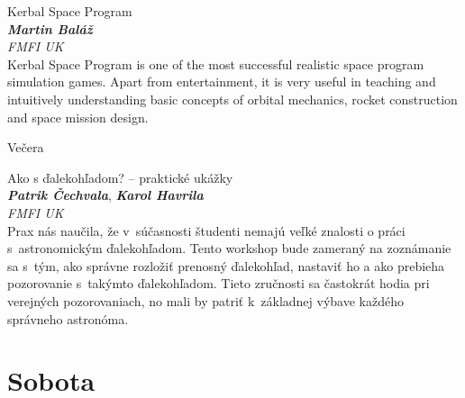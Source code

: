 \documentclass[a4paper]{report}
\begin{document}
                    \begin{tcolorbox}[
                                    colback=white,
                    colframe=black!70!white,
                                fonttitle=\Large\bfseries,
                title=18:00
            ]
                {\Large Kerbal Space Program}
                                                            \\ \textbf{\textit{Martin Baláž}}
                                                    \\ \textit{FMFI UK}                \\[2ex]Kerbal Space Program is one of the most successful realistic space program simulation games. Apart from entertainment, it is very useful in teaching and intuitively understanding basic concepts of orbital mechanics, rocket construction and space mission design.
            \end{tcolorbox}
                    \begin{tcolorbox}[
                                    colback=red!10,
                    colframe=red!50!black,
                                fonttitle=\Large\bfseries,
                title=19:00
            ]
                {\Large Večera}
                                                            \end{tcolorbox}
                    \begin{tcolorbox}[
                                    colback=blue!10,
                    colframe=black!50!blue,
                                fonttitle=\Large\bfseries,
                title=21:00
            ]
                {\Large Ako s ďalekohľadom? -- praktické ukážky}
                                                            \\ \textit{\textbf{Patrik Čechvala}}, \textit{\textbf{Karol Havrila}}                                                    \\ \textit{FMFI UK}                \\[2ex]Prax nás naučila, že v súčasnosti študenti nemajú veľké znalosti o práci s astronomickým ďalekohľadom. Tento workshop bude zameraný na zoznámanie sa s tým, ako správne rozložiť prenosný ďalekohľad, nastaviť ho a ako prebieha pozorovanie s takýmto ďalekohľadom. Tieto zručnosti sa častokrát hodia pri verejných pozorovaniach, no mali by patriť k základnej výbave každého správneho astronóma.
            \end{tcolorbox}
                    \section{Sobota}
\end{document}
